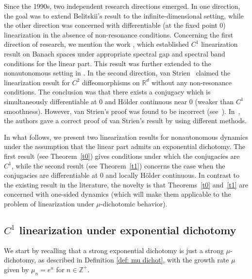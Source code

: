 \documentclass[reqno, a4paper, 10pt]{amsart}
\theoremstyle{plain}
\numberwithin{equation}{section}
\theoremstyle{remark}
\def\R{\mathbb{R}}
\def\Z{\mathbb{Z}}
\begin{document}
Since the 1990s, two independent research directions emerged. In one direction, the  goal was to extend Belitskii's result to the infinite-dimensional setting, while the other direction was concerned with   differentiable   (at the fixed point $0$) linearization in the absence of non-resonance conditions. 
Concerning the first direction of research, we mention the work \cite{ZZJ}, which established  $C^1$ linearization result on  Banach spaces under appropriate  spectral gap and  spectral band conditions for the linear part. This result was further extended to the nonautonomous setting in \cite{DZZ}. In the second direction, van Strien~\cite{Stri-JDE90} claimed  the linearization result for  $C^2$ diffeomorphisms on $\R^d$ without any non-resonance conditions. The conclusion was that there exists  a conjugacy  which is simultaneously differentiable at 0 and H\"older
continuous near 0 (weaker than $C^1$ smoothness). However,  van Strien's proof was found to be incorrect (see~\cite{Ray-JDE98}). In~\cite{DZZ20}, the authors gave a correct proof of 
van Strien's result by using  different methods.

In what follows, we present two linearization results for nonautonomous dynamics under the assumption that the linear part admits an exponential dichotomy. The first result (see Theorem~\ref{t0}) gives conditions under which the conjugacies are $C^1$, while the second result (see Theorem~\ref{t1}) concerns the case when the conjugacies are differentiable at $0$ and locally H\"older
continuous. In contrast to the existing result in the literature, the novelty is that Theorems~\ref{t0} and~\ref{t1} are concerned with one-sided dynamics (which will make them applicable to the problem of linearization under $\mu$-dichotomic behavior).



\subsection{$C^1$ linearization under exponential dichotomy} 
We start by recalling that a strong exponential dichotomy is just a strong $\mu$-dichotomy, as described in Definition \ref{def: mu dichot}, with the growth rate $\mu$ given by $\mu_n=e^n$ for $n\in \Z^+$.
\end{document}
